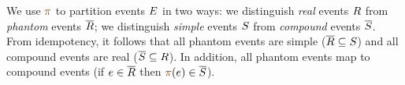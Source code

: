 We use $\fmrg{}$ to partition events $E$ in two ways: we distinguish
\emph{real} events $R$ from \emph{phantom} events $\overline{R}$; we
distinguish \emph{simple} events $S$ from \emph{compound} events
$\overline{S}$.   From idempotency, it follows that all phantom events are simple
($\overline{R}\subseteq S$) and all compound events are real
($\overline{S}\subseteq R$).  In addition, all phantom events map to compound
events (if $e\in\overline{R}$ then $\fmrg{\aEv}\in\dmEvs$).


